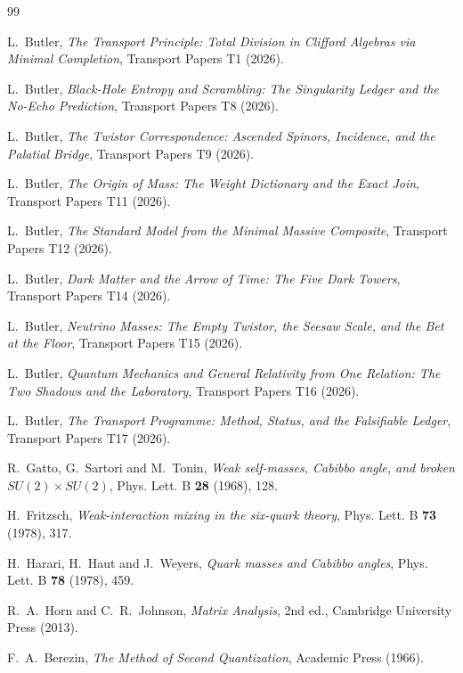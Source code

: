 \documentclass[11pt]{article}
\theoremstyle{definition}
\begin{document}
\begin{thebibliography}{99}

L.~Butler,
\emph{The Transport Principle: Total Division in Clifford Algebras via Minimal Completion},
Transport Papers T1 (2026).

L.~Butler,
\emph{Black-Hole Entropy and Scrambling: The Singularity Ledger and the No-Echo Prediction},
Transport Papers T8 (2026).

L.~Butler,
\emph{The Twistor Correspondence: Ascended Spinors, Incidence, and the Palatial Bridge},
Transport Papers T9 (2026).

L.~Butler,
\emph{The Origin of Mass: The Weight Dictionary and the Exact Join},
Transport Papers T11 (2026).

L.~Butler,
\emph{The Standard Model from the Minimal Massive Composite},
Transport Papers T12 (2026).

L.~Butler,
\emph{Dark Matter and the Arrow of Time: The Five Dark Towers},
Transport Papers T14 (2026).

L.~Butler,
\emph{Neutrino Masses: The Empty Twistor, the Seesaw Scale, and the Bet at the Floor},
Transport Papers T15 (2026).

L.~Butler,
\emph{Quantum Mechanics and General Relativity from One Relation: The Two Shadows and the Laboratory},
Transport Papers T16 (2026).

L.~Butler,
\emph{The Transport Programme: Method, Status, and the Falsifiable Ledger},
Transport Papers T17 (2026).

R.~Gatto, G.~Sartori and M.~Tonin,
\emph{Weak self-masses, Cabibbo angle, and broken $SU(2) \times SU(2)$},
Phys. Lett. B \textbf{28} (1968), 128.

H.~Fritzsch,
\emph{Weak-interaction mixing in the six-quark theory},
Phys. Lett. B \textbf{73} (1978), 317.

H.~Harari, H.~Haut and J.~Weyers,
\emph{Quark masses and Cabibbo angles},
Phys. Lett. B \textbf{78} (1978), 459.

R.~A.~Horn and C.~R.~Johnson,
\emph{Matrix Analysis}, 2nd ed.,
Cambridge University Press (2013).

F.~A.~Berezin,
\emph{The Method of Second Quantization},
Academic Press (1966).


\end{thebibliography}
\end{document}
